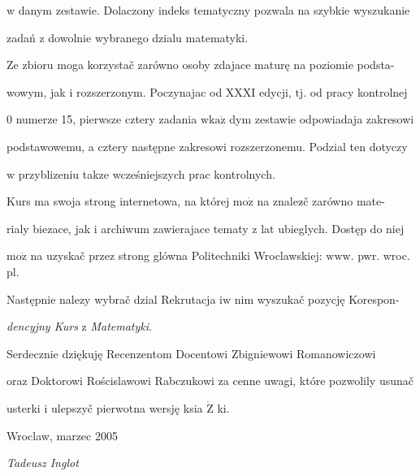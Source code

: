 \documentclass[a4paper,12pt]{article}
\begin{document}
$\mathrm{w}$ danym zestawie. Dolaczony indeks tematyczny pozwala na szybkie wyszukanie

zadań $\mathrm{z}$ dowolnie wybranego dzialu matematyki.

Ze zbioru moga korzystač zarówno osoby zdajace maturę na poziomie podsta-

wowym, jak $\mathrm{i}$ rozszerzonym. Poczynajac od XXXI edycji, $\mathrm{t}\mathrm{j}$. od pracy kontrolnej

$0$ numerze 15, pierwsze cztery zadania $\mathrm{w}\mathrm{k}\mathrm{a}\dot{\mathrm{z}}$ dym zestawie odpowiadaja zakresowi

podstawowemu, a cztery następne zakresowi rozszerzonemu. Podzial ten dotyczy

$\mathrm{w}$ przyblizeniu takze wcześniejszych prac kontrolnych.

Kurs ma swoja strong internetowa, na której $\mathrm{m}\mathrm{o}\dot{\mathrm{z}}$ na znalez$\acute{}$č zarówno mate-

rialy biezace, jak $\mathrm{i}$ archiwum zawierajace tematy $\mathrm{z}$ lat ubieglych. Dostęp do niej

$\mathrm{m}\mathrm{o}\dot{\mathrm{z}}$ na uzyskač przez strong glówna Politechniki Wroclawskiej: $\mathrm{w}\mathrm{w}\mathrm{w}$. pwr. wroc. pl.

Następnie nalezy wybrač dzial Rekrutacja $\mathrm{i}\mathrm{w}$ nim wyszukač pozycję Korespon-

{\it dencyjny Kurs} $\mathrm{z}$ {\it Matematyki}.

Serdecznie dziękuję Recenzentom Docentowi Zbigniewowi Romanowiczowi

oraz Doktorowi Rościslawowi Rabczukowi za cenne uwagi, które pozwolily usunač

usterki $\mathrm{i}$ ulepszyč pierwotna wersję ksia $\dot{\mathrm{Z}}$ ki.

Wroclaw, marzec 2005

{\it Tadeusz Inglot}
\end{document}
